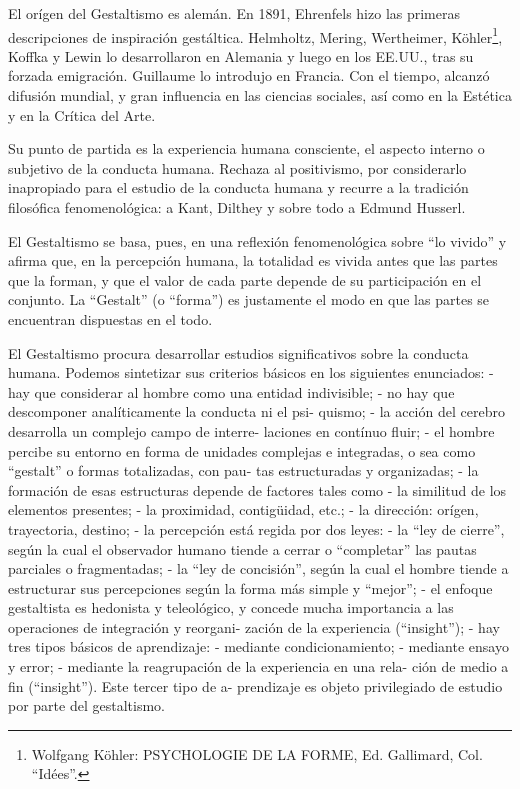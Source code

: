 \documentclass[
]{book}
\begin{document}
El orígen del Gestaltismo es alemán. En 1891, Ehrenfels hizo las primeras descripciones de inspiración gestáltica. Helmholtz, Mering, Wertheimer, Köhler\footnote{Wolfgang Köhler: PSYCHOLOGIE DE LA FORME, Ed. Gallimard, Col. ``Idées''.}, Koffka y Lewin lo desarrollaron en Alemania y luego en los EE.UU., tras su forzada emigración. Guillaume lo introdujo en Francia. Con el tiempo, alcanzó difusión mundial, y gran influencia en las ciencias sociales, así como en la Estética y en la Crítica del Arte.

Su punto de partida es la experiencia humana consciente, el aspecto interno o subjetivo de la conducta humana. Rechaza al positivismo, por considerarlo inapropiado para el estudio de la conducta humana y recurre a la tradición filosófica fenomenológica: a Kant, Dilthey y sobre todo a Edmund Husserl.

El Gestaltismo se basa, pues, en una reflexión fenomenológica sobre ``lo vivido'' y afirma que, en la percepción humana, la totalidad es vivida antes que las partes que la forman, y que el valor de cada parte depende de su participación en el conjunto. La ``Gestalt'' (o ``forma'') es justamente el modo en que las partes se encuentran dispuestas en el todo.

El Gestaltismo procura desarrollar estudios significativos sobre la conducta humana. Podemos sintetizar sus criterios básicos en los siguientes enunciados: - hay que considerar al hombre como una entidad indivisible; - no hay que descomponer analíticamente la conducta ni el psi- quismo; - la acción del cerebro desarrolla un complejo campo de interre- laciones en contínuo fluir; - el hombre percibe su entorno en forma de unidades complejas e integradas, o sea como ``gestalt'' o formas totalizadas, con pau- tas estructuradas y organizadas; - la formación de esas estructuras depende de factores tales como - la similitud de los elementos presentes; - la proximidad, contigüidad, etc.; - la dirección: orígen, trayectoria, destino; - la percepción está regida por dos leyes: - la ``ley de cierre'', según la cual el observador humano tiende a cerrar o ``completar'' las pautas parciales o fragmentadas; - la ``ley de concisión'', según la cual el hombre tiende a estructurar sus percepciones según la forma más simple y ``mejor''; - el enfoque gestaltista es hedonista y teleológico, y concede mucha importancia a las operaciones de integración y reorgani- zación de la experiencia (``insight''); - hay tres tipos básicos de aprendizaje: - mediante condicionamiento; - mediante ensayo y error; - mediante la reagrupación de la experiencia en una rela- ción de medio a fin (``insight''). Este tercer tipo de a- prendizaje es objeto privilegiado de estudio por parte del gestaltismo.
\end{document}
